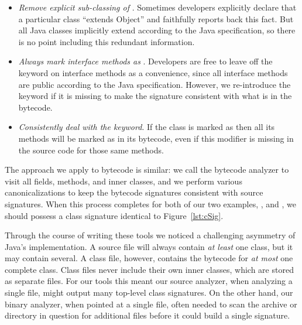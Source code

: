 \begin{itemize}

\item \emph{Remove explicit sub-classing of }.
    Sometimes developers explicitly declare that a particular class ``extends Object''
    and  faithfully reports back this fact.
    But all Java classes implicitly extend  according to
    the Java specification, so there is no point including this redundant
    information.

\vspace{0.3em}
\item \emph{Always mark interface methods as }.
    Developers are free to leave off the  keyword on
    interface methods as a convenience, since all interface methods are
    public according to the Java specification.  However, we re-introduce
    the  keyword if it is missing to make the signature
    consistent with what is in the bytecode.

\vspace{0.3em}
\item \emph{Consistently deal with the  keyword}.
    If the class is marked as  then all its methods will
    be marked as  in its bytecode, even if this modifier
    is missing in the source code for those same methods.

\end{itemize}


The approach we apply to bytecode is similar:  we call the 
bytecode analyzer to visit all fields, methods, and inner classes, and we
perform various canonicalizations to keep the bytecode signatures
consistent with source signatures.  When this process completes for both of
our two examples, , and , we should possess a
class signature identical to Figure~\ref{lst:cSig}.

Through the course of writing these tools we noticed a challenging
asymmetry of Java's implementation.  A source file will always contain
\emph{at least} one class, but it may contain several.  A class file,
however, contains the bytecode for \emph{at most} one complete class.
Class files never
include their own inner classes, which are stored as separate files.
For our tools this meant our source analyzer, when analyzing a
single file, might output many top-level class signatures.  On the other
hand, our binary analyzer, when pointed at a single file, often needed to
scan the archive or directory in question for additional files before it
could build a single signature.

